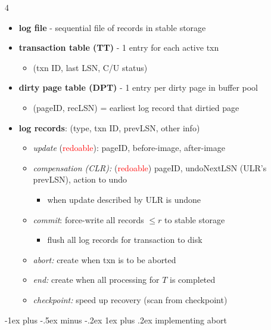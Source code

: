 \documentclass{article}
\makeatletter
\renewcommand{\subsubsection}{\@startsection{subsubsection}{3}{0mm}%
    {-1ex plus -.5ex minus -.2ex}%
    {1ex plus .2ex}%
{\normalfont\bfseries}}%
\makeatother
\begin{document}
\begin{multicols*}{4}
\begin{scriptsize}
  \begin{itemize}
    \item \textbf{log file} - sequential file of records in stable storage
    \item \textbf{transaction table (TT)} - 1 entry for each active txn
      \begin{itemize}
        \item (txn ID, last LSN, C/U status)
      \end{itemize}
    \item \textbf{dirty page table (DPT)} - 1 entry per dirty page in buffer pool
      \begin{itemize}
        \item (pageID, recLSN) = earliest log record that dirtied page
      \end{itemize}
    \item \textbf{log records}: (type, txn ID, prevLSN, other info)
      \begin{itemize}
        \item \textit{update} (\attention \textcolor{red}{redoable}): pageID, before-image, after-image
        \item \textit{compensation (CLR):} (\attention \textcolor{red}{redoable}) pageID, undoNextLSN (ULR's prevLSN), action to undo
          \begin{itemize}
            \item when update described by ULR is undone
          \end{itemize}
        \item \textit{commit}: force-write all records $\leq r$ to stable storage
          \begin{itemize}
            \item flush all log records for transaction to disk
          \end{itemize}
        \item \textit{abort:} create when txn is to be aborted
        \item \textit{end:} create when all processing for $T$ is completed
        \item \textit{checkpoint:} speed up recovery (scan from checkpoint)
      \end{itemize}
  \end{itemize}

  \subsubsection{implementing abort}


\end{scriptsize}
\end{multicols*}
\end{document}

